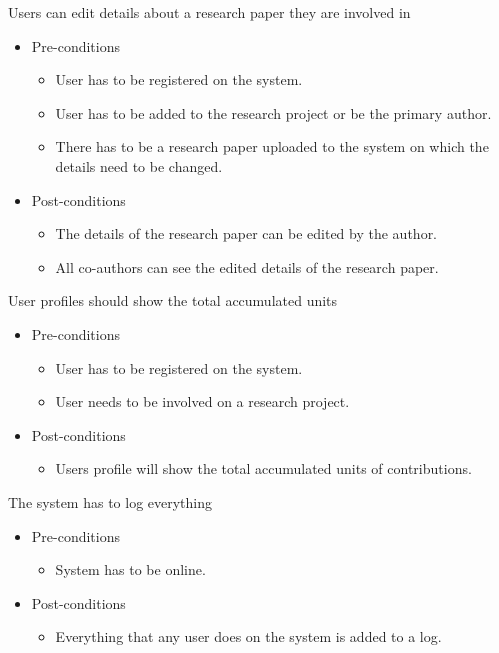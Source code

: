 \documentclass[a4paper,12pt]{report}
\begin{document}
	Users can edit details about a research paper they are involved in
	\begin{itemize}
		\item Pre-conditions
			\begin{itemize}
				\item User has to be registered on the system.
				\item User has to be added to the research project or be the primary author.
				\item There has to be a research paper uploaded to the system on which the details need to be changed.
			\end{itemize}
		\item Post-conditions
			\begin{itemize}
				\item The details of the research paper can be edited by the author.
				\item All co-authors can see the edited details of the research paper.
			\end{itemize}
	\end{itemize}

	User profiles should show the total accumulated units
	\begin{itemize}
		\item Pre-conditions
			\begin{itemize}
				\item User has to be registered on the system.
				\item User needs to be involved on a research project.
			\end{itemize}
		\item Post-conditions
			\begin{itemize}
				\item Users profile will show the total accumulated units of contributions.
			\end{itemize}
	\end{itemize}

	The system has to log everything
	\begin{itemize}
		\item Pre-conditions
			\begin{itemize}
				\item System has to be online.
			\end{itemize}
		\item Post-conditions
			\begin{itemize}
				\item Everything that any user does on the system is added to a log.
			\end{itemize}
	\end{itemize}
\end{document}
